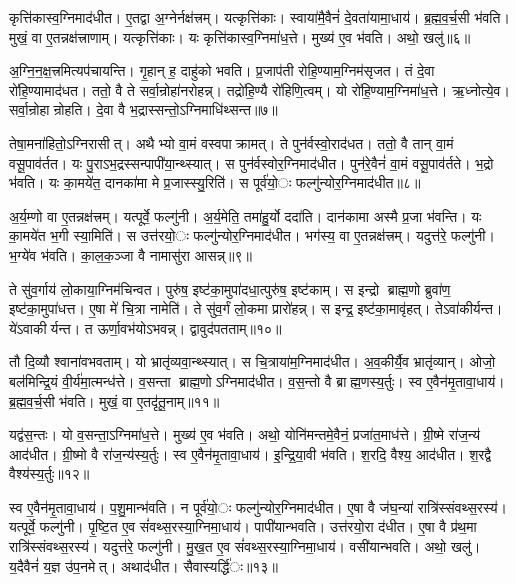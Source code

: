कृत्ति॑कास्व॒ग्निमाद॑धीत। ए॒तद्वा अ॒ग्नेर्नक्ष॑त्त्रम्। यत्कृत्ति॑काः। स्वाया॑मै॒वैनं॑ दे॒वता॑यामा॒धाय॑। ब्र॒ह्म॒व॒र्च॒सी भ॑वति। मुखं॒ वा ए॒तन्नक्ष॑त्त्राणाम्। यत्कृत्ति॑काः। यः कृत्ति॑कास्व॒ग्निमा॑ध॒त्ते। मुख्य॑ ए॒व भ॑वति। अथो॒ खलु॑॥६॥

अ॒ग्नि॒न॒क्ष॒त्त्रमित्यप॑चायन्ति। गृ॒हान् ह॒ दाहु॑को भवति। प्र॒जाप॑ती रोहि॒ण्याम॒ग्निम॑सृजत। तं दे॒वा रो॑हि॒ण्यामाद॑धत। ततो॒ वै ते सर्वा॒न्रोहा॑नरोहन्न्। तद्रो॑हि॒ण्यै रो॑हिणि॒त्वम्। यो रो॑हि॒ण्याम॒ग्निमा॑ध॒त्ते। ऋ॒ध्नोत्ये॒व। सर्वा॒न्रोहान्रोहति। दे॒वा वै भ॒द्रास्सन्तो॒ऽग्निमाधि॑थ्सन्त॥७॥

तेषा॒मना॑हितो॒ऽग्निरासीत्। अथैभ्यो वा॒मं वस्वपाक्रामत्। ते पुन॑र्वस्वो॒राद॑धत। ततो॒ वै तान् वा॒मं वसू॒पाव॑र्तत। यः पु॒राऽभ॒द्रस्सन्पापी॑या॒न्थ्स्यात्। स पुन॑र्वस्वोर॒ग्निमाद॑धीत। पुन॑रे॒वैनं॑ वा॒मं वसू॒पाव॑र्तते। भ॒द्रो भ॑वति। यः का॒मये॑त॒ दानका॑मा मे प्र॒जास्स्यु॒रिति॑। स पूर्व॑यो॒ः फल्गु॑न्योर॒ग्निमाद॑धीत॥८॥

अ॒र्य॒म्णो वा ए॒तन्नक्ष॑त्त्रम्। यत्पूर्वे॒ फल्गु॑नी। अ॒र्य॒मेति॒ तमा॑हु॒र्यो ददा॑ति। दान॑कामा अस्मै प्र॒जा भ॑वन्ति। यः का॒मये॑त भ॒गी स्या॒मिति॑। स उत्त॑रयो॒ः फल्गु॑न्योर॒ग्निमाद॑धीत। भग॑स्य॒ वा ए॒तन्नक्ष॑त्त्रम्। यदुत्त॑रे॒ फल्गु॑नी। भ॒ग्ये॑व भ॑वति। का॒ल॒क॒ञ्जा वै नामासु॑रा आसन्न्॥९॥

ते सु॑व॒र्गाय॑ लो॒काया॒ग्निम॑चिन्वत। पुरु॑ष॒ इष्ट॑का॒मुपा॑दधा॒त्पुरु॑ष॒ इष्ट॑काम्। स इन्द्रो ब्राह्म॒णो ब्रुवा॑ण॒ इष्ट॑का॒मुपा॑धत्त। ए॒षा मे॑ चि॒त्रा नामेति॑। ते सु॑व॒र्गं लो॒कमा प्रारो॑हन्न्। स इन्द्र॒ इष्ट॑का॒मावृ॑हत्। तेऽवा॑कीर्यन्त। ये॑ऽवाकीर्यन्त। त ऊर्णा॒वभ॑योऽभवन्न्। द्वावुद॑पतताम्॥१०॥

तौ दि॒व्यौ श्वाना॑वभवताम्। यो भ्रातृ॑व्यवा॒न्थ्स्यात्। स चि॒त्राया॑म॒ग्निमाद॑धीत। अ॒व॒कीर्यै॒व भ्रातृ॑व्यान्। ओजो॒ बल॑मिन्द्रि॒यं वी॒र्य॑मा॒त्मन्ध॑त्ते। व॒सन्ता ब्राह्म॒णोऽग्निमाद॑धीत। व॒स॒न्तो वै ब्राह्म॒णस्य॒र्तुः। स्व ए॒वैन॑मृ॒तावा॒धाय॑। ब्र॒ह्म॒व॒र्च॒सी भ॑वति। मुखं॒ वा ए॒तदृ॑तू॒नाम्॥११॥

यद्व॑स॒न्तः। यो व॒सन्ता॒ऽग्निमा॑ध॒त्ते। मुख्य॑ ए॒व भ॑वति। अथो॒ योनि॑मन्तमे॒वैनं॒ प्रजा॑त॒माध॑त्ते। ग्री॒ष्मे रा॑ज॒न्य॑ आद॑धीत। ग्री॒ष्मो वै रा॑ज॒न्य॑स्य॒र्तुः। स्व ए॒वैन॑मृ॒तावा॒धाय॑। इ॒न्द्रि॒या॒वी भ॑वति। श॒रदि॒ वैश्य॒ आद॑धीत। श॒रद्वै वैश्य॑स्य॒र्तुः॥१२॥

स्व ए॒वैन॑मृ॒तावा॒धाय॑। प॒शु॒मान्भ॑वति। न पूर्व॑यो॒ः फल्गु॑न्योर॒ग्निमाद॑धीत। ए॒षा वै ज॑घ॒न्या॑ रात्रि॑स्संवथ्स॒रस्य॑। यत्पूर्वे॒ फल्गु॑नी। पृ॒ष्टि॒त ए॒व सं॑वथ्स॒रस्या॒ग्निमा॒धाय॑। पापी॑यान्भवति। उत्त॑रयो॒रा द॑धीत। ए॒षा वै प्र॑थ॒मा रात्रि॑स्संवथ्स॒रस्य॑। यदुत्त॑रे॒ फल्गु॑नी। मु॒ख॒त ए॒व सं॑वथ्स॒रस्या॒ग्निमा॒धाय॑। वसी॑यान्भवति। अथो॒ खलु॑। य॒दैवैनं॑ य॒ज्ञ उ॑प॒नमेत्। अथाद॑धीत। सैवास्यर्द्धि॑ः॥१३॥
\anuvakamend[खल्वा॑धिथ्सन्त॒ फल्गु॑न्योर॒ग्निमाद॑धीतासन्नपततामृतू॒नां वैश्य॑स्य॒र्तुरुत्त॑रे॒ फल्गु॑नी॒ षट्च॑]

